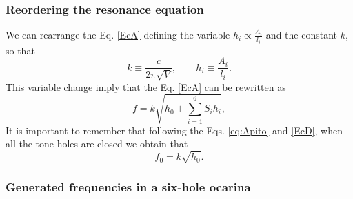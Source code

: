 \documentclass[11pt,twocolumn]{article}
\begin{document}
\subsubsection{Reordering the resonance equation}
We can rearrange the Eq. \ref{EcA} defining the variable $h_{i}\propto \frac{A_{i}}{l_{i}}$ 
and the constant $k$, so that
\begin{equation} \label{EcC}
k \equiv \frac{c}{2 {\pi}\sqrt{V}},\qquad  h_{i} \equiv  \frac{A_{i}}{l_{i}}.
\end{equation}
This variable change imply that the Eq. \ref{EcA} can be rewritten as
\begin{equation} \label{EcD}
f = k \sqrt{h_0 +\sum_{i=1}^{6}{S_i h_i}},
\end{equation}
It is important to remember that following the Eqs. \ref{eq:Apito} and \ref{EcD},
when all the tone-holes are closed we obtain that 
\begin{equation} \label{EcDa}
f_0 = k \sqrt{h_0}. %
\end{equation}

\subsubsection{Generated frequencies in a six-hole ocarina}
\end{document}
